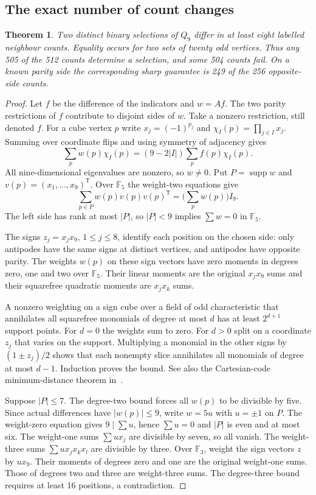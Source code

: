 \documentclass[11pt,a4paper]{article}
\newtheorem{theorem}{Theorem}[section]
\theoremstyle{definition}
\theoremstyle{remark}
\begin{document}
\subsection{The exact number of count changes}\label{sec:exact-count241}
\begin{theorem}\label{thm:count-distance241}
Two distinct binary selections of $Q_9$ differ in at least eight
labelled neighbour counts. Equality occurs for two sets of twenty odd
vertices. Thus any 505 of the 512 counts determine a selection, and
some 504 counts fail. On a known parity side the corresponding sharp
guarantee is 249 of the 256 opposite-side counts.
\end{theorem}
\begin{proof}
Let $f$ be the difference of the indicators and $w=Af$. The two parity
restrictions of $f$ contribute to disjoint sides of $w$. Take a nonzero
restriction, still denoted $f$. For a cube vertex $p$ write
$x_j=(-1)^{p_j}$ and $\chi_I(p)=\prod_{j\in I}x_j$. Summing over
coordinate flips and using symmetry of adjacency gives
\[
\sum_p w(p)\chi_I(p)=(9-2|I|)\sum_p f(p)\chi_I(p).
\]
All nine-dimensional eigenvalues are nonzero, so $w\ne0$.
Put $P=\operatorname{supp}w$ and $v(p)=(x_1,\ldots,x_9)^{\mathsf T}$.
Over $\mathbb F_5$ the weight-two equations give
\[
\sum_{p\in P} w(p)v(p)v(p)^{\mathsf T}=\Big(\sum_p w(p)\Big)I_9 .
\]
The left side has rank at most $|P|$, so $|P|<9$ implies
$\sum w=0$ in $\mathbb F_5$.

The signs $z_j=x_jx_9$, $1\le j\le8$, identify each position on
the chosen side: only antipodes have the same signs at distinct
vertices, and antipodes have opposite parity. The weights $w(p)$
on these sign vectors have zero moments in degrees zero, one and
two over $\mathbb F_5$. Their linear moments are the original
$x_jx_9$ sums and their squarefree quadratic moments are $x_jx_k$ sums.

A nonzero weighting on a sign cube over a field of odd characteristic
that annihilates all squarefree monomials of degree at most $d$ has
at least $2^{d+1}$ support points. For $d=0$ the weights sum to zero.
For $d>0$ split on a coordinate $z_j$ that varies on the support.
Multiplying a monomial in the other signs by $(1\pm z_j)/2$ shows
that each nonempty slice annihilates all monomials of degree at most
$d-1$. Induction proves the bound. See also the Cartesian-code
minimum-distance theorem in~\cite{cartesian241}.

Suppose $|P|\le7$. The degree-two bound forces all $w(p)$ to be
divisible by five. Since actual differences have $|w(p)|\le9$,
write $w=5u$ with $u=\pm1$ on $P$. The weight-zero equation gives
$9\mid\sum u$, hence $\sum u=0$ and $|P|$ is even and at most six.
The weight-one sums $\sum ux_j$ are divisible by seven, so all vanish.
The weight-three sums $\sum ux_jx_kx_l$ are divisible by three.
Over $\mathbb F_3$, weight the sign vectors $z$ by $u x_9$.
Their moments of degrees zero and one are the original weight-one sums.
Those of degrees two and three are weight-three sums. The degree-three
bound requires at least 16 positions, a contradiction.


\end{proof}
\end{document}
